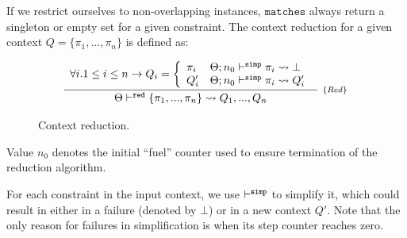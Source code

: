 \documentclass[a4paper, 11pt]{article}
\begin{document}
If we restrict ourselves to non-overlapping instances, 
$\mathtt{matches}$ always return a singleton or empty set for 
a given constraint. The context reduction for a given context
$Q = \{\pi_1,...,\pi_n\}$ is defined as: 

\begin{figure}[H] 
  \[
    \begin{array}{c}
      \infer[_{\{Red\}}]
            {\Theta \reduce \{\pi_1,...,\pi_n\} \leadsto Q_1,..., Q_n}
            {\begin{array}{l}
              \forall i. 1 \leq i \leq n \to Q_i = \left\{
                    \begin{array}{ll}
                      \pi_i & \Theta ; n_0\simp \pi_i \leadsto \bot \\
                      Q'_i & \Theta ; n_0 \simp \pi_i \leadsto Q'_i  
                    \end{array} 
                    \right. 
             \end{array}}
    \end{array}
  \]
  \centering 
  \caption{Context reduction.}
  \label{fig:context-reduction}
\end{figure}
Value $n_0$ denotes the initial ``fuel'' counter used to 
ensure termination of the reduction algorithm.

For each constraint in the input context, we use $\vdash^{\mathtt{simp}}$ to 
simplify it, which could result in either in a failure (denoted 
by $\bot$) or in a new context $ Q'$. Note that the only reason for failures in 
simplification is when its step counter reaches zero.
\end{document}

